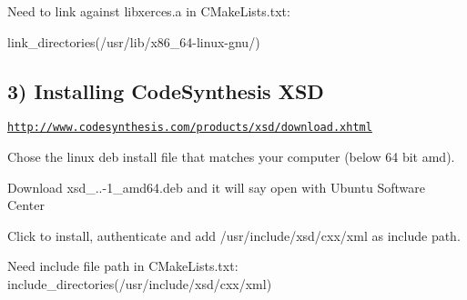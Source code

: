Need to link against libxerces.\-a in C\-Make\-Lists.\-txt\-: \begin{DoxyVerb}link_directories(/usr/lib/x86_64-linux-gnu/)
\end{DoxyVerb}


\subsection*{3) Installing Code\-Synthesis X\-S\-D }

\href{http://www.codesynthesis.com/products/xsd/download.xhtml}{\tt http\-://www.\-codesynthesis.\-com/products/xsd/download.\-xhtml}
\begin{DoxyEnumerate}
\item Chose the linux deb install file that matches your computer (below 64 bit amd).
\item Download xsd\-\_..-\/1\-\_\-amd64.\-deb and it will say open with Ubuntu Software Center
\item Click to install, authenticate and add /usr/include/xsd/cxx/xml as include path.
\end{DoxyEnumerate}

Need include file path in C\-Make\-Lists.\-txt\-: include\-\_\-directories(/usr/include/xsd/cxx/xml) 
